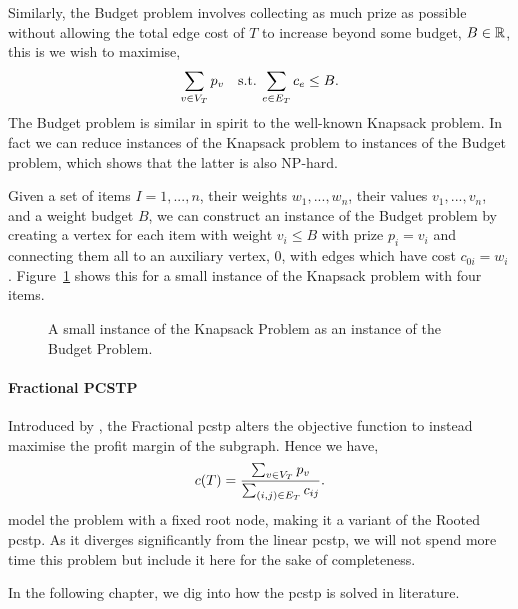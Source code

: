 Similarly, the Budget problem involves collecting as much prize as possible without allowing the
 total edge cost of $T$ to increase beyond some budget, $B \in \mathbb{R}$, this is we wish to maximise,
 \[\sum_{v \in V_T} p_v \quad \text{s.t.} \: \sum_{e \in E_T} c_e \leq B\mathnormal{.}\]
 The Budget problem is similar in spirit to the well-known Knapsack problem. In fact we can
 reduce instances of the Knapsack problem to instances of the Budget problem, which shows that
  the latter is also NP-hard.

 Given a set of items $I = 1,...,n$, their weights $w_1,...,w_n$, their values $v_1,...,v_n$, and
 a weight budget $B$, we
 can construct an instance of the Budget problem by creating a vertex for each item with weight
 $v_i \leq B$ with prize $p_i = v_i$ and connecting them all to an auxiliary vertex, $0$, with
 edges which have cost $c_{0i} = w_i$. Figure~\ref{fig:pcstp:budget:knapsack} shows this for
  a small instance of the Knapsack problem with four items.

 \begin{figure}[h!]\centering
{}
\caption{A small instance of the Knapsack Problem as an instance of the Budget Problem.}
\label{fig:pcstp:budget:knapsack}
\end{figure}

\paragraph{Fractional PCSTP}
Introduced by \citet{klau2003fractional}, the Fractional \gls{pcstp}
alters the objective function to instead maximise the profit
margin of the subgraph. Hence we have,
\[c(T) = \frac{\sum_{v \in V_T} p_v}{\sum_{(i,j) \in E_T} c_{ij}}\mathnormal{.}\]
\citet{klau2003fractional} model the problem with a fixed root node, making it a variant
of the Rooted \gls{pcstp}. As it diverges significantly from the linear \gls{pcstp},
we will not spend more time this problem but include it here for the sake of completeness.

\medskip
In the following chapter, we dig into how the \acrlong{pcstp} is solved in literature.
